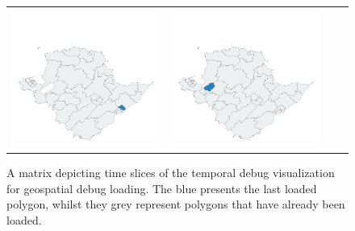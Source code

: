 \begin{figure}[p]
\begin{tabularx}{1\textwidth}{XXXX}
\includegraphics[width=1\linewidth]{images/ch6/loading/23}&
\includegraphics[width=1\linewidth]{images/ch6/loading/24} \\ %
\end{tabularx}
\caption{A matrix depicting time slices of the temporal debug visualization for geospatial debug loading. The blue presents the last loaded polygon, whilst they grey represent polygons that have already been loaded.} \label{fig:loadingMatrix}
\end{figure}

